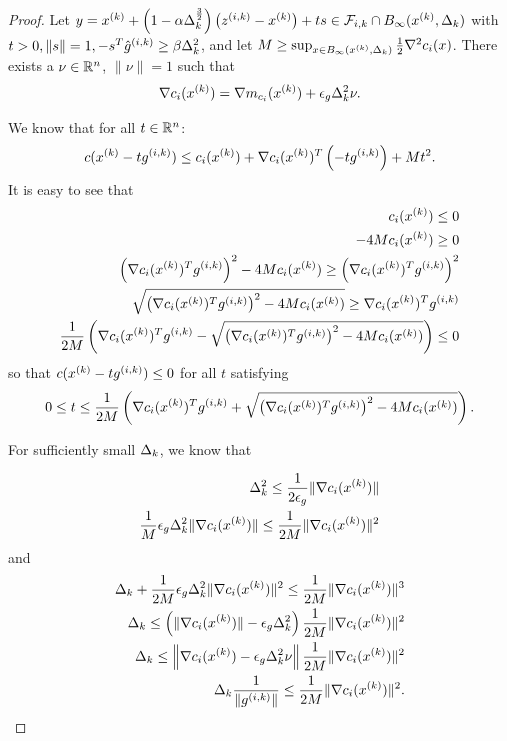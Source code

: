 \begin{proof}

Let $y = {x^{(k)}} + \left(1 - \alpha\Delta_k^{\frac 3 2}\right)\left({z^{(i, k)}} - {x^{(k)}}\right) + ts \in {\mathcal F_{i, k}} \cap B_{\infty}({x^{(k)}}, \Delta_k) $ with $t > 0, \|s\| = 1, -s^T{{\hat g}^{(i, k)}} \ge \beta \Delta_k^2$, and let $M \ge \sup_{x \in B_{\infty}({x^{(k)}}, \Delta_k)} \frac 1 2 \nabla^2 c_i(x)$.
There exists a $\nu \in {\mathbb R^{n}}$, $\|\nu\|=1$ such that 
\begin{align*}
\nabla c_i({x^{(k)}}) = \nabla m_{c_i}({x^{(k)}}) + \epsilon_{g}\Delta_k^2\nu.
\end{align*}

We know that for all $t \in {\mathbb R^{n}}$:
\begin{align*}
c({x^{(k)}} - t{g^{(i, k)}}) \le c_i({x^{(k)}}) + \nabla c_i({x^{(k)}})^T\left(- t{g^{(i, k)}}\right) + Mt^2. \\
\end{align*}
It is easy to see that
\begin{align*}
c_i({x^{(k)}}) \le 0 \\
- 4 M c_i({x^{(k)}}) \ge 0 \\
\left(\nabla c_i({x^{(k)}})^T{g^{(i, k)}}\right)^2 - 4 M c_i({x^{(k)}}) \ge \left(\nabla c_i({x^{(k)}})^T{g^{(i, k)}}\right)^2 \\
\sqrt{\left(\nabla c_i({x^{(k)}})^T{g^{(i, k)}}\right)^2 - 4 M c_i({x^{(k)}})} \ge \nabla c_i({x^{(k)}})^T{g^{(i, k)}} \\
\frac{1}{2M}\left(\nabla c_i({x^{(k)}})^T{g^{(i, k)}} - \sqrt{\left(\nabla c_i({x^{(k)}})^T{g^{(i, k)}}\right)^2 - 4 M c_i({x^{(k)}})} \right) \le 0\\
\end{align*}
so that $c({x^{(k)}} - t{g^{(i, k)}}) \le 0$ for all $t$ satisfying
\begin{align*}
0 \le t \le \frac{1}{2M}\left(\nabla c_i({x^{(k)}})^T{g^{(i, k)}} + \sqrt{\left(\nabla c_i({x^{(k)}})^T{g^{(i, k)}}\right)^2 - 4 M c_i({x^{(k)}})} \right). \\
\end{align*}

For sufficiently small $\Delta_k$, we know that

\begin{align*}
\Delta_k^2 \le \frac{1}{2\epsilon_g}\|\nabla c_i({x^{(k)}})\| \\
\frac{1}{M}\epsilon_g \Delta_k^2\|\nabla c_i({x^{(k)}})\| \le \frac{1}{2M}\|\nabla c_i({x^{(k)}})\|^2
\end{align*}
and
\begin{align*}
\Delta_k + \frac{1}{2M}\epsilon_g \Delta_k^2\|\nabla c_i({x^{(k)}})\|^2 \le \frac{1}{2M}\|\nabla c_i({x^{(k)}})\|^3 \\
\Delta_k \le \left(\|\nabla c_i({x^{(k)}})\| - \epsilon_g \Delta_k^2\right) \frac{1}{2M}\|\nabla c_i({x^{(k)}})\|^2 \\
\Delta_k \le \left\|\nabla c_i({x^{(k)}}) - \epsilon_g \Delta_k^2\nu\right\| \frac{1}{2M}\|\nabla c_i({x^{(k)}})\|^2 \\
\Delta_k \frac{1}{\|{g^{(i, k)}}\|} \le \frac{1}{2M}\|\nabla c_i({x^{(k)}})\|^2.
\end{align*}


\end{proof}
